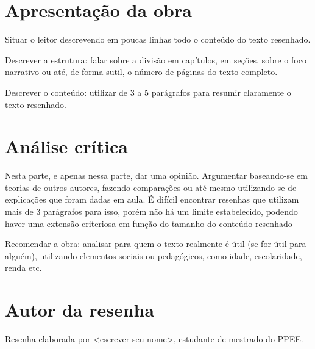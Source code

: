 \documentclass[11pt]{article}
\begin{document}
\section{Apresentação da obra}
Situar o leitor descrevendo em poucas linhas todo o conteúdo do texto resenhado.

Descrever a estrutura: falar sobre a divisão em capítulos, em seções, sobre o foco narrativo ou até, de forma sutil, o número de páginas do texto completo.

Descrever o conteúdo: utilizar de 3 a 5 parágrafos para resumir claramente o texto resenhado.

\section{Análise crítica}
Nesta parte, e apenas nessa parte, dar uma opinião. Argumentar baseando-se em teorias de outros autores, fazendo comparações ou até mesmo utilizando-se de explicações que foram dadas em aula. É difícil encontrar resenhas que utilizam mais de 3 parágrafos para isso, porém não há um limite estabelecido, podendo haver uma extensão criteriosa em função do tamanho do conteúdo resenhado

Recomendar a obra: analisar para quem o texto realmente é útil (se for útil para alguém), utilizando elementos sociais ou pedagógicos, como idade, escolaridade, renda etc.

\section{Autor da resenha}
Resenha elaborada por <escrever seu nome>, estudante de mestrado do PPEE. 



\end{document}
